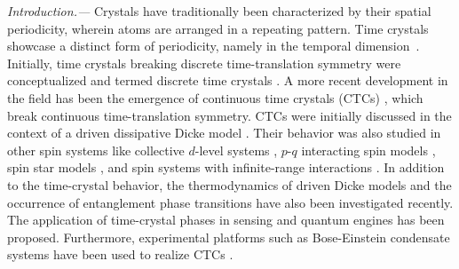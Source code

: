 \documentclass[pra,aps,twocolumn,superscriptaddress,notitlepage]{revtex4-1}
\begin{document}
	
	
	\noindent \textit{Introduction.---} Crystals have traditionally been characterized by their spatial periodicity, wherein atoms are arranged in a repeating pattern. 
	Time crystals showcase a distinct form of periodicity, namely in the temporal dimension~\cite{wilczek2012quantum,watanabe2015absence,RevModPhys.95.031001,sacha2017time}.
	Initially, time crystals breaking discrete time-translation symmetry were conceptualized and termed discrete time crystals \cite{sacha2015modeling,else2016floquet,khemani2016phase,russomanno2017floquet,surace2017floquet,heugel2019classical,khasseh2019many,sakurai2021chimera, sacha2017time, RevModPhys.95.031001}. 
	A more recent development in the field has been the emergence of continuous time crystals (CTCs) \cite{iemini2018boundary, tucker2018shattered,buca2019non,Booker_2020,PhysRevLett.123.260401,zhu2019dicke,lledo2019driven,seibold2020dissipative,prazeres2021boundary,piccitto2021symmetries,carollo2022exact,seeding2022michal,krishna2022measurement,hurtado2020raretimecrystal,PhysRevB.108.024302,PhysRevLett.127.133601,cabot2023nonequilibrium}, which break continuous time-translation symmetry. 
	CTCs were initially discussed in the context of a driven dissipative Dicke model \cite{iemini2018boundary}. 
	Their behavior was also studied in other spin systems like collective $d$-level systems \cite{prazeres2021boundary}, $p$-$q$ interacting spin models \cite{piccitto2021symmetries}, spin star models \cite{krishna2022measurement}, and spin systems with infinite-range interactions \cite{PhysRevB.108.024302}. 
	In addition to the time-crystal behavior, the thermodynamics \cite{igor_thermodynamics} of driven Dicke models and the occurrence of entanglement phase transitions \cite{saro_postselection, albert_trajectory} have also been investigated recently.
	The application of time-crystal phases in sensing \cite{cabot2023continuous,montenegro2023quantum} and quantum engines \cite{carollo2020engines} has been proposed.
	Furthermore, experimental platforms such as Bose-Einstein condensate systems have been used to realize CTCs \cite{kessler2021observation,kongkhambut2022observation}.
	
\end{document}
